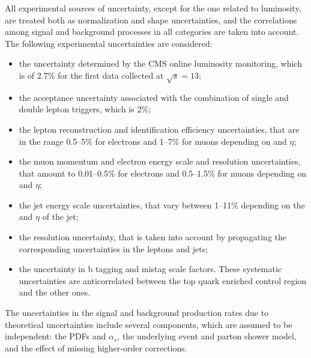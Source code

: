 All experimental sources of uncertainty, except for the one related to luminosity, are treated both as normalization and shape uncertainties, and the correlations among signal and background processes in all categories are taken into account. The following experimental uncertainties are considered:
\begin{itemize}
\item the uncertainty determined by the CMS online luminosity monitoring, which is of 2.7\% for the first data collected at $\sqrt{s}=13$\TeV;
\item the acceptance uncertainty associated with the combination of single and double lepton triggers, which is 2\%;
\item the lepton reconstruction and identification efficiency uncertainties, that are in the range 0.5--5\% for electrons and 1--7\% for muons depending on \pt and $\eta$;
\item the muon momentum and electron energy scale and resolution uncertainties, that amount to 0.01--0.5\% for electrons and 0.5--1.5\% for muons depending on \pt and $\eta$;
\item the jet energy scale uncertainties, that vary between 1--11\% depending on the \pt and $\eta$ of the jet;
\item the \MET resolution uncertainty, that is taken into account by propagating the corresponding uncertainties in the leptons and jets;
\item the uncertainty in b tagging and mistag scale factors. These systematic uncertainties are anticorrelated between the top quark enriched control region and the other ones.
\end{itemize}

The uncertainties in the signal and background production rates due
to theoretical uncertainties include several components, which are assumed to be
independent: the PDFs and $\alpha_{s}$, the underlying event and parton shower model,
and the effect of missing higher-order corrections.

